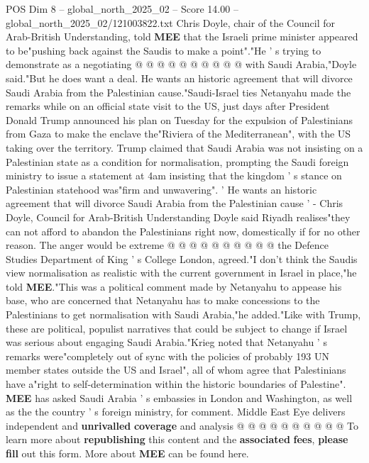 \begin{textsample}{POS Dim 8 – global\_north\_2025\_02 – Score 14.00 – global\_north\_2025\_02/121003822.txt}
Chris Doyle, chair of the Council for Arab-British Understanding, told \textbf{MEE} that the Israeli prime minister appeared to be"pushing back against the Saudis to make a point"."He ' s trying to demonstrate as a negotiating @ @ @ @ @ @ @ @ @ @ with Saudi Arabia,"Doyle said."But he does want a deal.
He wants an historic agreement that will divorce Saudi Arabia from the Palestinian cause."Saudi-Israel ties Netanyahu made the remarks while on an official state visit to the US, just days after President Donald Trump announced his plan on Tuesday for the expulsion of Palestinians from Gaza to make the enclave the"Riviera of the Mediterranean", with the US taking over the territory.
Trump claimed that Saudi Arabia was not insisting on a Palestinian state as a condition for normalisation, prompting the Saudi foreign ministry to issue a statement at 4am insisting that the kingdom ' s stance on Palestinian statehood was"firm and unwavering". ' He wants an historic agreement that will divorce Saudi Arabia from the Palestinian cause ' - Chris Doyle, Council for Arab-British Understanding Doyle said Riyadh realises"they can not afford to abandon the Palestinians right now, domestically if for no other reason.
The anger would be extreme @ @ @ @ @ @ @ @ @ @ the Defence Studies Department of King ' s College London, agreed."I don't think the Saudis view normalisation as realistic with the current government in Israel in place,"he told \textbf{MEE}."This was a political comment made by Netanyahu to appease his base, who are concerned that Netanyahu has to make concessions to the Palestinians to get normalisation with Saudi Arabia,"he added."Like with Trump, these are political, populist narratives that could be subject to change if Israel was serious about engaging Saudi Arabia."Krieg noted that Netanyahu ' s remarks were"completely out of sync with the policies of probably 193 UN member states outside the US and Israel", all of whom agree that Palestinians have a"right to self-determination within the historic boundaries of Palestine". \textbf{MEE} has asked Saudi Arabia ' s embassies in London and Washington, as well as the the country ' s foreign ministry, for comment.
Middle East Eye delivers independent and \textbf{unrivalled} \textbf{coverage} and analysis @ @ @ @ @ @ @ @ @ @ To learn more about \textbf{republishing} this content and the \textbf{associated} \textbf{fees}, \textbf{please} \textbf{fill} out this form.
More about \textbf{MEE} can be found here.

\end{textsample}
